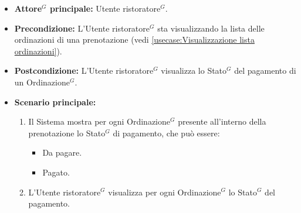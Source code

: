 \label{usecase:Visualizzazione \gls{Stato}$^G$ di pagamento}
\begin{itemize}
	
    \item \textbf{\gls{Attore}$^G$ principale:} \gls{Utente ristoratore}$^G$.

	\item \textbf{Precondizione:} L'\gls{Utente ristoratore}$^G$ sta visualizzando la lista delle ordinazioni di una prenotazione (vedi \autoref{usecase:Visualizzazione lista ordinazioni}).

	\item \textbf{Postcondizione:} L'\gls{Utente ristoratore}$^G$ visualizza lo \gls{Stato}$^G$ del pagamento di un \gls{Ordinazione}$^G$.

	\item \textbf{Scenario principale:}
	\begin{enumerate}
		\item Il Sistema mostra per ogni \gls{Ordinazione}$^G$ presente all'interno della prenotazione lo \gls{Stato}$^G$ di pagamento, che può essere:
        \begin{itemize}
            \item Da pagare.
            \item Pagato.
        \end{itemize}
        \item L'\gls{Utente ristoratore}$^G$ visualizza per ogni \gls{Ordinazione}$^G$ lo \gls{Stato}$^G$ del pagamento.
	\end{enumerate}

\end{itemize}